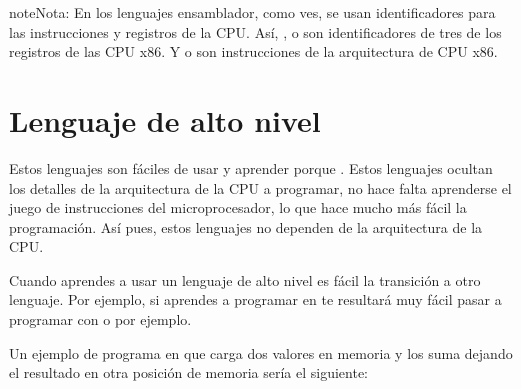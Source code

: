 \documentclass[letterpaper,10pt,spanish]{sphinxmanual}
\begin{document}
\begin{sphinxadmonition}{note}{Nota:}
\sphinxAtStartPar
En los lenguajes ensamblador, como ves, se usan identificadores para las instrucciones y registros de la CPU. Así, ,  o  son identificadores de tres de los registros de las CPU x86. Y  o  son instrucciones de la arquitectura de CPU x86.
\end{sphinxadmonition}


\section{Lenguaje de alto nivel}
\label{\detokenize{lenguajes_programacion_evolucion_historica:lenguaje-de-alto-nivel}}
\sphinxAtStartPar
Estos lenguajes son fáciles de usar y aprender porque . Estos lenguajes ocultan los detalles de la arquitectura de la CPU a programar, no hace falta aprenderse el juego de instrucciones del microprocesador, lo que hace mucho más fácil la programación. Así pues, estos lenguajes no dependen de la arquitectura de la CPU.

\sphinxAtStartPar
Cuando aprendes a usar un lenguaje de alto nivel es fácil la transición a otro lenguaje. Por ejemplo, si aprendes a programar en  te resultará muy fácil pasar a programar con  o  por ejemplo.

\sphinxAtStartPar
Un ejemplo de programa en  que carga dos valores en memoria y los suma dejando el resultado en otra posición de memoria sería el siguiente:

\begin{sphinxVerbatim}[commandchars=\\\{\}]
    
       

      
      

        

     
\end{sphinxVerbatim}
\end{document}
